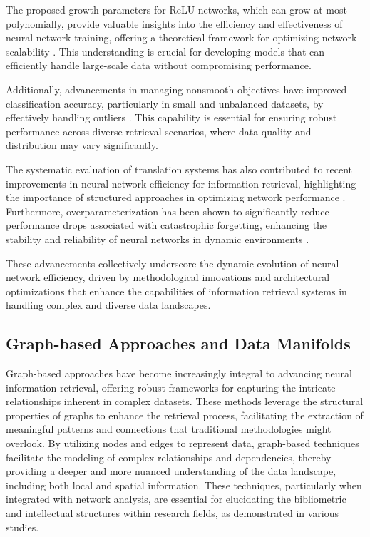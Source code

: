 The proposed growth parameters for ReLU networks, which can grow at most polynomially, provide valuable insights into the efficiency and effectiveness of neural network training, offering a theoretical framework for optimizing network scalability \cite{morina2024growthparametersapproximatingrelu}. This understanding is crucial for developing models that can efficiently handle large-scale data without compromising performance.

Additionally, advancements in managing nonsmooth objectives have improved classification accuracy, particularly in small and unbalanced datasets, by effectively handling outliers \cite{peiris2021deeplearningnonsmoothobjectives}. This capability is essential for ensuring robust performance across diverse retrieval scenarios, where data quality and distribution may vary significantly.

The systematic evaluation of translation systems has also contributed to recent improvements in neural network efficiency for information retrieval, highlighting the importance of structured approaches in optimizing network performance \cite{bogoychev2020domaintranslationesenoisesynthetic}. Furthermore, overparameterization has been shown to significantly reduce performance drops associated with catastrophic forgetting, enhancing the stability and reliability of neural networks in dynamic environments \cite{goldfarb2022analysiscatastrophicforgettingrandom}.

These advancements collectively underscore the dynamic evolution of neural network efficiency, driven by methodological innovations and architectural optimizations that enhance the capabilities of information retrieval systems in handling complex and diverse data landscapes.


\subsection{Graph-based Approaches and Data Manifolds} \label{subsec:Graph-based Approaches and Data Manifolds}

Graph-based approaches have become increasingly integral to advancing neural information retrieval, offering robust frameworks for capturing the intricate relationships inherent in complex datasets. These methods leverage the structural properties of graphs to enhance the retrieval process, facilitating the extraction of meaningful patterns and connections that traditional methodologies might overlook. By utilizing nodes and edges to represent data, graph-based techniques facilitate the modeling of complex relationships and dependencies, thereby providing a deeper and more nuanced understanding of the data landscape, including both local and spatial information. These techniques, particularly when integrated with network analysis, are essential for elucidating the bibliometric and intellectual structures within research fields, as demonstrated in various studies. \cite{Contentsli3,ullah2019graphconvolutionalnetworksanalysis,alemu2018multifeaturefusionimageretrieval}




